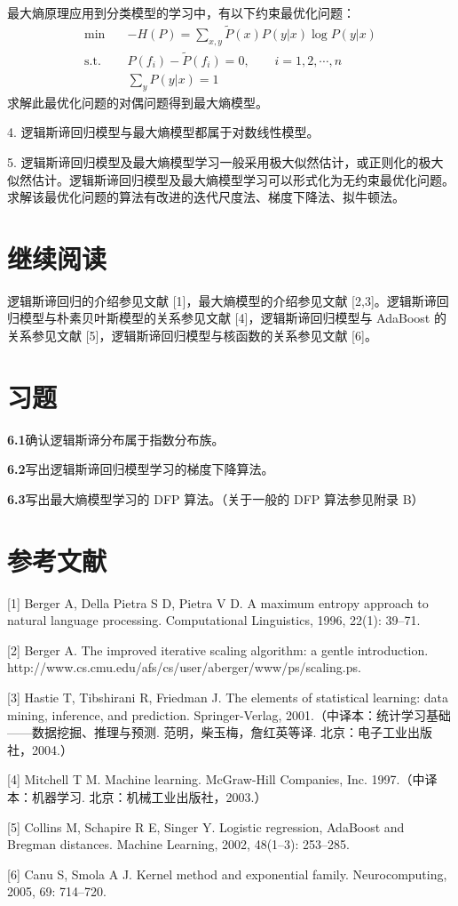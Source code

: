 \documentclass[UTF8,12pt,a4paper,fontset=fandol]{ctexart}
\begin{document}
最大熵原理应用到分类模型的学习中，有以下约束最优化问题：
\[
\begin{aligned}
\min\quad &-H(P)=\sum_{x,y}\tilde{P}(x)P(y|x)\log P(y|x)\\
\mathrm{s.t.}\quad &P(f_i)-\tilde{P}(f_i)=0,\qquad i=1,2,\cdots,n\\
&\sum_y P(y|x)=1
\end{aligned}
\]
求解此最优化问题的对偶问题得到最大熵模型。

4. 逻辑斯谛回归模型与最大熵模型都属于对数线性模型。

5. 逻辑斯谛回归模型及最大熵模型学习一般采用极大似然估计，或正则化的极大似然估计。逻辑斯谛回归模型及最大熵模型学习可以形式化为无约束最优化问题。求解该最优化问题的算法有改进的迭代尺度法、梯度下降法、拟牛顿法。

\section*{继续阅读}

逻辑斯谛回归的介绍参见文献 [1]，最大熵模型的介绍参见文献 [2,3]。逻辑斯谛回归模型与朴素贝叶斯模型的关系参见文献 [4]，逻辑斯谛回归模型与 AdaBoost 的关系参见文献 [5]，逻辑斯谛回归模型与核函数的关系参见文献 [6]。

\section*{习题}

\noindent\textbf{6.1}\quad 确认逻辑斯谛分布属于指数分布族。

\noindent\textbf{6.2}\quad 写出逻辑斯谛回归模型学习的梯度下降算法。

\noindent\textbf{6.3}\quad 写出最大熵模型学习的 DFP 算法。（关于一般的 DFP 算法参见附录 B）

\section*{参考文献}

[1] Berger A, Della Pietra S D, Pietra V D. A maximum entropy approach to natural language processing. Computational Linguistics, 1996, 22(1): 39--71.

[2] Berger A. The improved iterative scaling algorithm: a gentle introduction. http://www.cs.cmu.edu/afs/cs/user/aberger/www/ps/scaling.ps.

[3] Hastie T, Tibshirani R, Friedman J. The elements of statistical learning: data mining, inference, and prediction. Springer-Verlag, 2001.（中译本：统计学习基础——数据挖掘、推理与预测. 范明，柴玉梅，詹红英等译. 北京：电子工业出版社，2004.）

[4] Mitchell T M. Machine learning. McGraw-Hill Companies, Inc. 1997.（中译本：机器学习. 北京：机械工业出版社，2003.）

[5] Collins M, Schapire R E, Singer Y. Logistic regression, AdaBoost and Bregman distances. Machine Learning, 2002, 48(1--3): 253--285.

[6] Canu S, Smola A J. Kernel method and exponential family. Neurocomputing, 2005, 69: 714--720.
\end{document}
